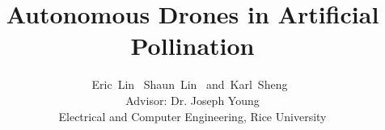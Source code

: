 \documentclass[conference]{IEEEtran}
\begin{document}
\title{Autonomous Drones in Artificial Pollination}

\author{Eric~Lin~
        Shaun~Lin~
        and~Karl~Sheng~\\ 
        Advisor: Dr. Joseph Young\\
        Electrical and Computer Engineering, Rice University
        }%
\maketitle











% 
\end{document}
